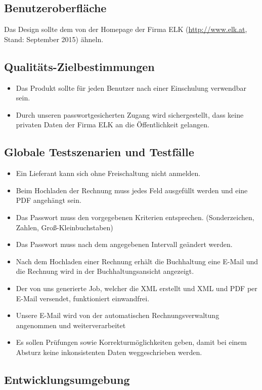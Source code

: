 \subsection{Benutzeroberfläche}

Das Design sollte dem von der Homepage der Firma ELK (\url{http://www.elk.at},
Stand: September 2015) ähneln.


\subsection{Qualitäts-Zielbestimmungen}
\begin{itemize}
\item Das Produkt sollte für jeden Benutzer nach einer Einschulung verwendbar
sein. 
\item Durch unseren passwortgesicherten Zugang wird sichergestellt, dass
keine privaten Daten der Firma ELK an die Öffentlichkeit gelangen. 
\end{itemize}

\subsection{Globale Testszenarien und Testfälle}
\begin{itemize}
\item Ein Lieferant kann sich ohne Freischaltung nicht anmelden. 
\item Beim Hochladen der Rechnung muss jedes Feld ausgefüllt werden und
eine PDF angehängt sein. 
\item Das Passwort muss den vorgegebenen Kriterien entsprechen. (Sonderzeichen,
Zahlen, Groß-Kleinbuchstaben) 
\item Das Passwort muss nach dem angegebenen Intervall geändert werden. 
\item Nach dem Hochladen einer Rechnung erhält die Buchhaltung eine E-Mail
und die Rechnung wird in der Buchhaltungsansicht angezeigt. 
\item Der von uns generierte Job, welcher die XML erstellt und XML und PDF
per E-Mail versendet, funktioniert einwandfrei. 
\item Unsere E-Mail wird von der automatischen Rechnungsverwaltung angenommen
und weiterverarbeitet 
\item Es sollen Prüfungen sowie Korrekturmöglichkeiten geben, damit bei
einem Absturz keine inkonsistenten Daten weggeschrieben werden. 
\end{itemize}

\subsection{Entwicklungsumgebung}


